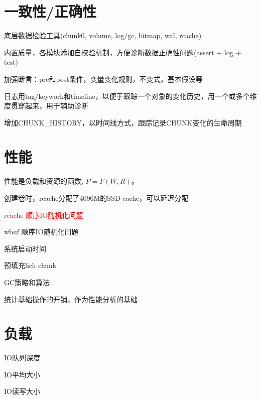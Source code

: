 \section{一致性/正确性}

\begin{tcolorbox}
\begin{compactenum}
    \item 底层数据检验工具(chunk0, volume, log/gc, bitmap, wal, rcache)
    \item 内置质量，各模块添加自校验机制，方便诊断数据正确性问题(assert + log + test)
    \item 加强断言：pre和post条件，变量变化规则，不变式，基本假设等
    \item 日志用tag/keywork和timeline，以便于跟踪一个对象的变化历史，用一个或多个维度贯穿起来，用于辅助诊断
    \item 增加CHUNK\_HISTORY，以时间线方式，跟踪记录CHUNK变化的生命周期
\end{compactenum}
\end{tcolorbox}

\section{性能}

性能是负载和资源的函数, $P=F(W, R)$。

\begin{tcolorbox}
\begin{compactenum}
    \item 创建卷时，rcache分配了4096M的SSD cache，可以延迟分配
    \item \textcolor{red}{rcache 顺序IO随机化问题}
    \item wbuf 顺序IO随机化问题
    \item 系统启动时间
    \item 预填充lich chunk
    \item GC策略和算法
    \item 统计基础操作的开销，作为性能分析的基础
\end{compactenum}
\end{tcolorbox}

\section{负载}

\begin{tcolorbox}
\begin{compactenum}
    \item IO队列深度
    \item IO平均大小
    \item IO读写大小
\end{compactenum}
\end{tcolorbox}

